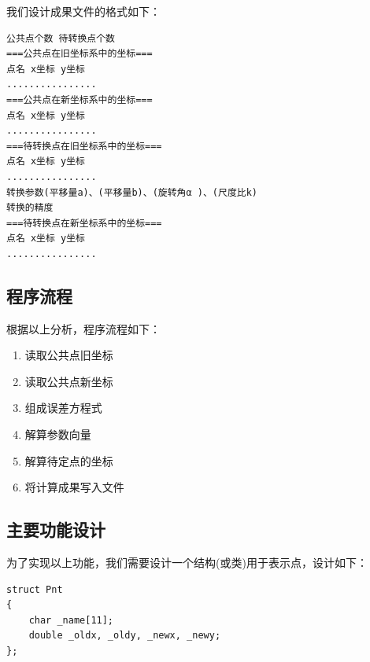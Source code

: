 我们设计成果文件的格式如下：
\begin{verbatim}
公共点个数 待转换点个数
===公共点在旧坐标系中的坐标===
点名 x坐标 y坐标
................
===公共点在新坐标系中的坐标===
点名 x坐标 y坐标
................
===待转换点在旧坐标系中的坐标===
点名 x坐标 y坐标
................
转换参数(平移量a)、(平移量b)、(旋转角α )、(尺度比k)
转换的精度
===待转换点在新坐标系中的坐标===
点名 x坐标 y坐标
................
\end{verbatim}

\subsection{程序流程}
根据以上分析，程序流程如下：
\begin{enumerate}
 \item 读取公共点旧坐标
  \item 读取公共点新坐标
  \item 组成误差方程式
  \item 解算参数向量
  \item 解算待定点的坐标
  \item 将计算成果写入文件
\end{enumerate}


\subsection{主要功能设计}
为了实现以上功能，我们需要设计一个结构(或类)用于表示点，设计如下：
\begin{verbatim}
struct Pnt
{
    char _name[11];
    double _oldx, _oldy, _newx, _newy;
};
\end{verbatim}

